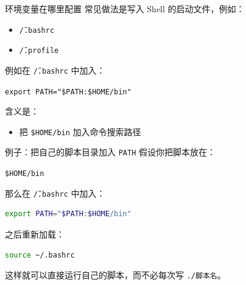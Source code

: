 \documentclass[aspectratio=169]{beamer}
\begin{document}
\begin{frame}{环境变量在哪里配置}
常见做法是写入 Shell 的启动文件，例如：

\begin{itemize}
  \item \texttt{\~/.bashrc}
  \item \texttt{\~/.profile}
\end{itemize}

\vspace{0.8em}
例如在 \texttt{\~/.bashrc} 中加入：

\begin{center}
\texttt{export PATH="\$PATH:\$HOME/bin"}
\end{center}

含义是：
\begin{itemize}
  \item 把 \texttt{\$HOME/bin} 加入命令搜索路径
\end{itemize}
\end{frame}

\begin{frame}[fragile]{例子：把自己的脚本目录加入 \texttt{PATH}}
假设你把脚本放在：

\begin{center}
\texttt{\$HOME/bin}
\end{center}

那么在 \texttt{\~/.bashrc} 中加入：

\begin{lstlisting}[language=bash]
export PATH="$PATH:$HOME/bin"
\end{lstlisting}

之后重新加载：

\begin{lstlisting}[language=bash]
source ~/.bashrc
\end{lstlisting}

这样就可以直接运行自己的脚本，而不必每次写 \texttt{./脚本名}。
\end{frame}
\end{document}
